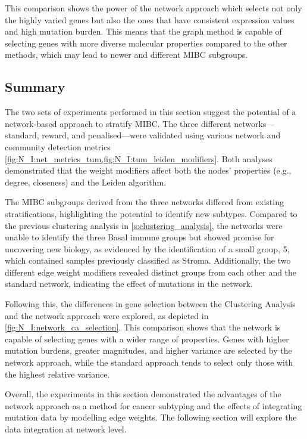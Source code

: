 This comparison shows the power of the network approach which selects not only the highly varied genes but also the ones that have consistent expression values and high mutation burden. This means that the graph method is capable of selecting genes with more diverse molecular properties compared to the other methods, which may lead to newer and different MIBC subgroups.

\subsection{Summary}

The two sets of experiments performed in this section suggest the potential of a network-based approach to stratify MIBC. The three different networks—standard, reward, and penalised—were validated using various network and community detection metrics \cref{fig:N_I:net_metrics_tum,fig:N_I:tum_leiden_modifiers}. Both analyses demonstrated that the weight modifiers affect both the nodes' properties (e.g., degree, closeness) and the Leiden algorithm.

The MIBC subgroups derived from the three networks differed from existing stratifications, highlighting the potential to identify new subtypes. Compared to the previous clustering analysis in \cref{s:clustering_analysis}, the networks were unable to identify the three Basal immune groups but showed promise for uncovering new biology, as evidenced by the identification of a small group, 5, which contained samples previously classified as Stroma. Additionally, the two different edge weight modifiers revealed distinct groups from each other and the standard network, indicating the effect of mutations in the network.

Following this, the differences in gene selection between the Clustering Analysis and the network approach were explored, as depicted in \cref{fig:N_I:network_ca_selection}. This comparison shows that the network is capable of selecting genes with a wider range of properties. Genes with higher mutation burdens, greater magnitudes, and higher variance are selected by the network approach, while the standard approach tends to select only those with the highest relative variance.

Overall, the experiments in this section demonstrated the advantages of the network approach as a method for cancer subtyping and the effects of integrating mutation data by modelling edge weights. The following section will explore the data integration at network level.
